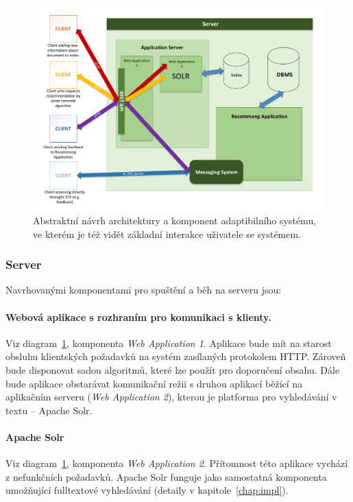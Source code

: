 \documentclass[thesis=M,czech]{FITthesis}[2014/05/07]
\begin{document}
\begin{figure}\centering
	\includegraphics[width=1.0\textwidth]{obr/DIPLOMKA_env.pdf}
 	\caption[Abstraktní návrh architektury a komponent adaptibilního systému]{Abstraktní návrh architektury a komponent adaptibilního systému, ve kterém je též vidět základní interakce uživatele se systémem.}\label{fig:recommeng}
\end{figure}	

\subsubsection{Server}
Navrhovanými komponentami pro spuštění a běh na serveru jsou:

\paragraph{Webová aplikace s rozhraním pro komunikaci s klienty.}
	Viz diagram~\ref{fig:recommeng}, komponenta \emph{Web Application 1}. Aplikace bude mít na starost obsluhu klientských požadavků na systém zasílaných protokolem HTTP. Zároveň bude disponovat sadou algoritmů, které lze použít pro doporučení obsahu. Dále bude aplikace obstarávat komunikační režii s druhou aplikací běžící na aplikačním serveru (\emph{Web Application 2}), kterou je platforma pro vyhledávání v textu – Apache Solr.

\paragraph{Apache Solr}
	Viz diagram~\ref{fig:recommeng}, komponenta \emph{Web Application 2}. Přítomnost této aplikace vychází z nefunkčních požadavků. Apache Solr funguje jako samostatná komponenta umožňující fulltextové vyhledávání (detaily v kapitole~\ref{chap:impl}).
\end{document}
